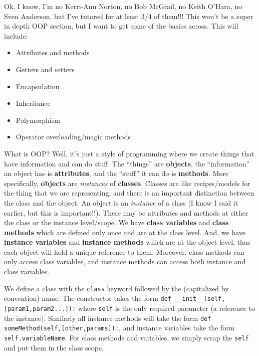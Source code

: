 \documentclass[11pt, twoside, reqno]{book}
\begin{document}
Ok, I know, I'm no Kerri-Ann Norton, no Bob McGrail, no Keith O'Hara, no Sven Anderson, but I've tutored for at least 3/4 of them!!! This won't be a super in depth OOP section, but I want to get some of the basics across. This will include:
\begin{itemize} \item Attributes and methods\end{itemize}
\begin{itemize} \item Getters and setters\end{itemize}
\begin{itemize} \item Encapsulation\end{itemize}
\begin{itemize} \item Inheritance\end{itemize}
\begin{itemize} \item Polymorphism\end{itemize}
\begin{itemize} \item Operator overloading/magic methods\end{itemize}

What is OOP? Well, it's just a style of programming where we create things that have information and can do stuff. The ``things'' are \textbf{objects}, the ``information'' an object has is \textbf{attributes}, and the ``stuff'' it can do is \textbf{methods}. More specifically, \textbf{objects} are \textit{instances} of \textbf{classes}. Classes are like recipes/models for the thing that we are representing, and there is an important distinction between the class and the object. An object is an \textit{instance} of a class (I know I said it earlier, but this is important!!). There may be attributes and methods at either the class or the instance level/scope. We have \textbf{class variables} and \textbf{class methods} which are defined only once and are at the class level. And, we have \textbf{instance variables} and \textbf{instance methods} which are at the object level, thus each object will hold a unique reference to them. Moreover, class methods can only access class variables, and instance methods can access both instance and class variables.

We define a class with the \texttt{class} keyword followed by the (capitalized by convention) name. The constructor takes the form \texttt{def \_\_init\_\_(self,[param1,param2...]):} where \texttt{self} is the only required parameter (a reference to the instance). Similarly all instance methods will take the form \texttt{def someMethod(self,[other,params]):}, and instance variables take the form \texttt{self.variableName}. For class methods and variables, we simply scrap the \texttt{self} and put them in the class scope.
\end{document}
